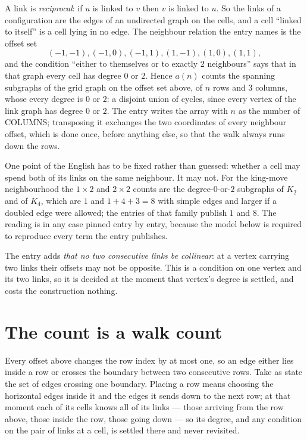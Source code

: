 \documentclass[11pt,a4paper]{article}
\theoremstyle{plain}
\theoremstyle{definition}
\begin{document}
A link is \emph{reciprocal}: if $u$ is linked to $v$ then $v$ is linked to $u$. So the links
of a configuration are the edges of an undirected graph on the cells, and a cell ``linked to
itself'' is a cell lying in no edge. The neighbour relation the entry names is the offset set
\[
(-1,-1), (-1,0), (-1,1), (1,-1), (1,0), (1,1),
\]
and the condition ``either to themselves or to exactly $2$ neighbours'' says that in that
graph every cell has degree $0$ or $2$. Hence $a(n)$ counts the spanning subgraphs of the
grid graph on the offset set above, of $n$ rows and $3$ columns,
whose every degree is $0$ or $2$: a disjoint union of cycles, since every vertex of the link graph has degree $0$ or $2$. The entry writes the array with $n$ as the number of COLUMNS; transposing it exchanges the two coordinates of every neighbour offset, which is done once, before anything else, so that the walk always runs down the rows.

One point of the English has to be fixed rather than guessed: whether a cell may spend both of
its links on the same neighbour. It may not. For the king-move neighbourhood the $1\times2$
and $2\times2$ counts are the degree-$0$-or-$2$ subgraphs of $K_2$ and of $K_4$, which are $1$
and $1+4+3=8$ with simple edges and larger if a doubled edge were allowed; the entries of that
family publish $1$ and $8$. The reading is in any case pinned entry by entry, because the
model below is required to reproduce every term the entry publishes.

The entry adds \emph{that no two consecutive links be collinear}: at a vertex carrying two
links their offsets may not be opposite. This is a condition on one vertex and its two links,
so it is decided at the moment that vertex's degree is settled, and costs the construction
nothing.

\section{The count is a walk count}

Every offset above changes the row index by at most one, so an edge either lies inside a row
or crosses the boundary between two consecutive rows. Take as state the set of edges crossing
one boundary. Placing a row means choosing the horizontal edges inside it and the edges it
sends down to the next row; at that moment each of its cells knows all of its links --- those
arriving from the row above, those inside the row, those going down --- so its degree, and any
condition on the pair of links at a cell, is settled there and never revisited.
\end{document}
